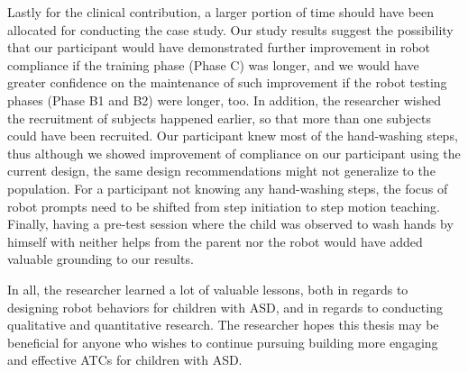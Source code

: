 Lastly for the clinical contribution, a larger portion of time should have been allocated for conducting the case study.  Our study results suggest the possibility that our participant would have demonstrated further improvement in robot compliance if the training phase (Phase C) was longer, and we would have greater confidence on the maintenance of such improvement if the robot testing phases (Phase B1 and B2) were longer, too.  In addition, the researcher wished the recruitment of subjects happened earlier, so that more than one subjects could have been recruited.  Our participant knew most of the hand-washing steps, thus although we showed improvement of compliance on our participant using the current design, the same design recommendations might not generalize to the population.  For a participant not knowing any hand-washing steps, the focus of robot prompts need to be shifted from step initiation to step motion teaching.  Finally, having a pre-test session where the child was observed to wash hands by himself with neither helps from the parent nor the robot would have added valuable grounding to our results.


In all, the researcher learned a lot of valuable lessons, both in regards to designing robot behaviors for children with ASD, and in regards to conducting qualitative and quantitative research.  The researcher hopes this thesis may be beneficial for anyone who wishes to continue pursuing building more engaging and effective ATCs for children with ASD.
